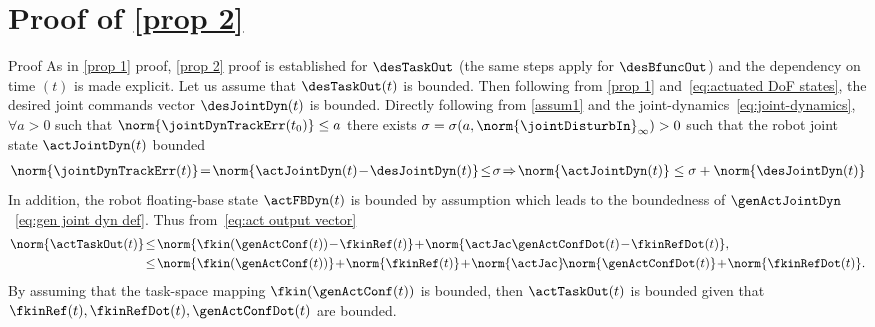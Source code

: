 \section{Proof of \cref{prop 2}}\label{proof:prop2}
\begin{custumProof}{Proof}
	As in \cref{prop 1} proof, \cref{prop 2} proof is established for $\desTaskOut $ (the same steps apply for $\desBfuncOut $) and the dependency on time $(t)$ is made explicit.
	Let us assume that $\desTaskOut(t) $ is  bounded. Then following from \cref{prop 1} and~\eqref{eq:actuated DoF states}, the desired joint commands vector $\desJointDyn(t)$ is bounded. Directly following from \cref{assum1} and the joint-dynamics~\eqref{eq:joint-dynamics}, $\forall a >0$ such that $\norm{\jointDynTrackErr(t_0)}\leq a$ there exists $\sigma = \sigma(a,\norm{\jointDisturbIn}_\infty)>0$ such that  the robot joint state $\actJointDyn(t) $ bounded
	\begin{align}\label{eq:boundedness of actJointDyn}
		\norm{\jointDynTrackErr(t)} \!=\! \norm{\actJointDyn(t) \!-\! \desJointDyn(t)}\!\leq\! \sigma  	\!\Rightarrow\! \norm{\actJointDyn(t)} \leq \sigma + \norm{\desJointDyn(t)}  %
	\end{align}
	In addition, the robot floating-base state $\actFBDyn(t) $ is bounded by assumption which leads to the boundedness of $\genActJointDyn$~\cref{eq:gen joint dyn def}. Thus from~\eqref{eq:act output vector}
	\begin{align}\label{eq:actTaskOut boundedness}
		\begin{split}
			\norm{\actTaskOut(t)}&\!\leq\! \norm{\fkin(\genActConf(t))\!-\!\fkinRef(t)} \!+\! \norm{\actJac\genActConfDot(t)\!-\!\fkinRefDot(t)}, \\
			&\!\leq\! \norm{\fkin(\genActConf(t))}\!+\!\norm{\fkinRef(t)} \!+\! \norm{\actJac}\!\norm{\genActConfDot(t)}\!+\!\norm{\fkinRefDot(t)}.
		\end{split}	 
	\end{align}
	By assuming that the task-space mapping $\fkin(\genActConf(t))$ is bounded, then $\actTaskOut(t)$ is bounded given that $\fkinRef(t),\fkinRefDot(t), \genActConfDot(t)$ are bounded. 

\end{custumProof}
